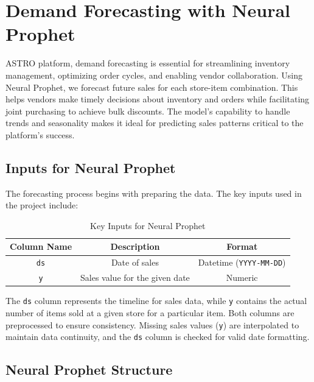 \section{Demand Forecasting with Neural Prophet}

ASTRO platform, demand forecasting is essential for streamlining inventory management, optimizing order cycles, and enabling vendor collaboration. Using Neural Prophet, we forecast future sales for each store-item combination. This helps vendors make timely decisions about inventory and orders while facilitating joint purchasing to achieve bulk discounts. The model’s capability to handle trends and seasonality makes it ideal for predicting sales patterns critical to the platform’s success.

\subsection{Inputs for Neural Prophet}

The forecasting process begins with preparing the data. The key inputs used in the project include:

\begin{table}[h!]
    \centering
    \begin{tabular}{|c|c|c|}
        \hline
        \textbf{Column Name} & \textbf{Description}           & \textbf{Format}                \\
        \hline
        \texttt{ds}          & Date of sales                  & Datetime (\texttt{YYYY-MM-DD}) \\
        \hline
        \texttt{y}           & Sales value for the given date & Numeric                        \\
        \hline
    \end{tabular}
    \caption{Key Inputs for Neural Prophet}
\end{table}

The \texttt{ds} column represents the timeline for sales data, while \texttt{y} contains the actual number of items sold at a given store for a particular item. Both columns are preprocessed to ensure consistency. Missing sales values (\texttt{y}) are interpolated to maintain data continuity, and the \texttt{ds} column is checked for valid date formatting.

\subsection{Neural Prophet Structure}

